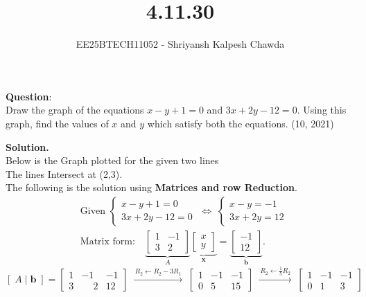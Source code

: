 \documentclass[journal]{IEEEtran}
\begin{document}
	
	
	\vspace{3cm}
	
	\title{4.11.30}
	\author{EE25BTECH11052 - Shriyansh Kalpesh Chawda}
	{\let\newpage\relax\maketitle}
	
	\renewcommand{\thefigure}{\theenumi}
	\renewcommand{\thetable}{\theenumi}
	\setlength{\intextsep}{10pt} 
	
	\renewcommand{\thetable}{\theenumi}
	
	\textbf{Question}:\\
Draw the graph of the equations $x - y + 1 = 0$ and $3x + 2y - 12 = 0$. Using this graph, find the values of $x$ and $y$ which satisfy both the equations. 
\hfill (10, 2021)

\textbf{Solution.}\\
Below is the Graph plotted for the given two lines \\
The lines Intersect at (2,3).\\
The following is the solution using \textbf{Matrices and row Reduction}.\\
\vspace{1cm}
\[
\begin{aligned}
	&\text{Given } 
	\begin{cases}
		x - y + 1 = 0\\
		3x + 2y - 12 = 0
	\end{cases}
	\;\Longleftrightarrow\;
	\begin{cases}
		x - y = -1\\
		3x + 2y = 12
	\end{cases} \\[4pt]
	&\text{Matrix form:}\quad
	\underbrace{\begin{bmatrix}1 & -1\\ 3 & 2\end{bmatrix}}_{A}
	\underbrace{\begin{bmatrix}x\\y\end{bmatrix}}_{\mathbf{x}}
	=
	\underbrace{\begin{bmatrix}-1\\12\end{bmatrix}}_{\mathbf{b}}.
\end{aligned}
\]
\vspace{0.5cm}
\[
\left[\; A \mid \mathbf{b} \;\right]
=
\left[
\begin{array}{cc|c}
	1 & -1 & -1\\
	3 & \phantom{-}2 & 12
\end{array}
\right]
\;\xrightarrow{\,R_2 \leftarrow R_2 - 3R_1\,}\;
\left[
\begin{array}{cc|c}
	1 & -1 & -1\\
	0 & 5 & 15
\end{array}
\right]
\;\xrightarrow{\,R_2 \leftarrow \tfrac{1}{5}R_2\,}\;
\left[
\begin{array}{cc|c}
	1 & -1 & -1\\
	0 & 1 & 3
\end{array}
\right]
\]
\end{document}
